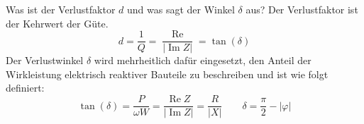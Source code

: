 
\setcounter{CardID}{2}
\begin{karte}{Was ist der Verlustfaktor $d$ und was sagt der Winkel $\delta$ aus?}
	Der Verlustfaktor ist der Kehrwert der Güte.
	\begin{equation*}
	d = \frac{1}{Q} = \frac{\operatorname{Re}}{|\operatorname{Im} Z|} = \tan (\delta)
	\end{equation*}
	Der Verlustwinkel $\delta$ wird mehrheitlich dafür eingesetzt, den Anteil der Wirkleistung elektrisch reaktiver Bauteile zu beschreiben und ist wie folgt definiert:
	\begin{equation*}
		\tan(\delta)=\frac{P}{\omega W}=\frac{\operatorname{Re} Z}{|\operatorname{Im} Z|}=\frac{R}{|X|}
		\qquad \delta = \frac{\pi}{2} - |\varphi|
	\end{equation*}
\end{karte}
